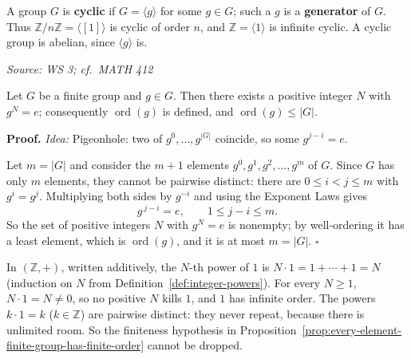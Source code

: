 \documentclass[11pt]{report}
\renewenvironment{proof}[1][Proof]{\noindent\textbf{#1.} }{\hfill$\square$\par\vspace{5pt}}
\newcommand{\srcline}[1]{\par\hfill{\footnotesize\textit{Source: #1}}}
\begin{document}
\begin{defbox}\label{def:cyclic-groups}
A group $G$ is \textbf{cyclic} if $G = \langle g \rangle$ for some $g \in G$; such a $g$ is a \textbf{generator} of $G$. Thus $\mathbb{Z}/n\mathbb{Z} = \langle [1] \rangle$ is cyclic of order $n$, and $\mathbb{Z} = \langle 1 \rangle$ is infinite cyclic. A cyclic group is abelian, since $\langle g \rangle$ is.
\srcline{WS 3; cf.\ MATH 412}
\end{defbox}

\begin{propbox}\label{prop:every-element-finite-group-has-finite-order}
Let $G$ be a finite group and $g \in G$. Then there exists a positive integer $N$ with $g^N = e$; consequently $\operatorname{ord}(g)$ is defined, and $\operatorname{ord}(g) \leq |G|$.
\end{propbox}

\begin{proof}
\textit{Idea:} Pigeonhole: two of $g^0, \ldots, g^{|G|}$ coincide, so some $g^{j-i} = e$.\par
Let $m = |G|$ and consider the $m + 1$ elements $g^0, g^1, g^2, \ldots, g^m$ of $G$. Since $G$ has only $m$ elements, they cannot be pairwise distinct: there are $0 \leq i < j \leq m$ with $g^i = g^j$. Multiplying both sides by $g^{-i}$ and using the Exponent Laws gives
\[ g^{\,j-i} = e, \qquad 1 \leq j - i \leq m. \]
So the set of positive integers $N$ with $g^N = e$ is nonempty; by well-ordering it has a least element, which is $\operatorname{ord}(g)$, and it is at most $m = |G|$.
\end{proof}

\begin{exbox}\label{ex:one-has-infinite-order-in-z}
In $(\mathbb{Z}, +)$, written additively, the $N$-th power of $1$ is $N \cdot 1 = 1 + \cdots + 1 = N$ (induction on $N$ from Definition~\ref{def:integer-powers}). For every $N \geq 1$, $N \cdot 1 = N \neq 0$, so no positive $N$ kills $1$, and $1$ has infinite order. The powers $k \cdot 1 = k$ ($k \in \mathbb{Z}$) are pairwise distinct: they never repeat, because there is unlimited room. So the finiteness hypothesis in Proposition~\ref{prop:every-element-finite-group-has-finite-order} cannot be dropped.
\end{exbox}
\end{document}
